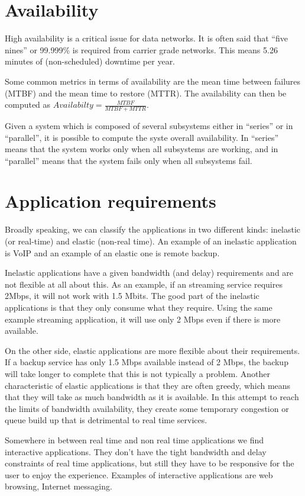 \section{Availability}

High availability is a critical issue for data networks.
It is often said that ``five nines'' or 99.999\% is required from carrier grade networks.
This means 5.26 minutes of (non-scheduled) downtime per year.

Some common metrics in terms of availability are the mean time between failures (MTBF) and the mean time to restore (MTTR).
The availability can then be computed as $Availabilty = \frac{MTBF}{MTBF+MTTR}$.

Given a system which is composed of several subsystems either in ``series'' or in ``parallel'', it is possible to compute the syste overall availability.
In ``series'' means that the system works only when all subsystems are working, and in ``parallel'' means that the system fails only when all subsystems fail.

\section{Application requirements}
Broadly speaking, we can classify the applications in two different kinds: inelastic (or real-time) and elastic (non-real time).
An example of an inelastic application is VoIP and an example of an elastic one is remote backup.

Inelastic applications have a given bandwidth (and delay) requirements and are not flexible at all about this.
As an example, if an streaming service requires 2Mbps, it will not work with 1.5 Mbits.
The good part of the inelastic applications is that they only consume what they require.
Using the same example streaming application, it will use only 2 Mbps even if there is more available.

On the other side, elastic applications are more flexible about their requirements.
If a backup service has only 1.5 Mbps available instead of 2 Mbps, the backup will take longer to complete that this is not typically a problem.
Another characteristic of elastic applications is that they are often greedy, which means that they will take as much bandwidth as it is available.
In this attempt to reach the limits of bandwidth availability, they create some temporary congestion or queue build up that is detrimental to real time services.

Somewhere in between real time and non real time applications we find interactive applications. 
They don't have the tight bandwidth and delay constraints of real time applications, but still they have to be responsive for the user to enjoy the experience.
Examples of interactive applications are web browsing, Internet messaging.

